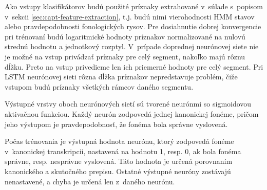 Ako vstupy klasifikátorov budú použité príznaky extrahované v~súlade s~popisom v~sekcii \ref{sec:capt-feature-extraction}, t.j. budú nimi vierohodnosti HMM stavov alebo pravdepodobnosti fonologických rysov. Pre dosiahnutie dobrej konvergencie pri trénovaní budú logaritmické hodnoty príznakov normalizované na nulovú strednú hodnotu a jednotkový rozptyl. V~prípade doprednej neurónovej siete nie je možné na vstup privádzať príznaky pre celý segment, nakoľko majú rôznu dĺžku. Preto na vstup privedieme len ich priemerné hodnoty pre celý segment. Pri LSTM neurónovej sieti rôzna dĺžka príznakov nepredstavuje problém, čiže vstupom budú príznaky všetkých rámcov daného segmentu.

Výstupné vrstvy oboch neurónových sietí sú tvorené neurónmi so sigmoidovou aktivačnou funkciou. Každý neurón zodpovedá jednej kanonickej fonéme, pričom jeho výstupom je pravdepodobnosť, že fonéma bola správne vyslovená.

\noindent Počas trénovania je výstupná hodnota neurónu, ktorý zodpovedá fonéme v~kanonickej transkripcii, nastavená na hodnotu 1, resp. 0, ak bola fonéma správne, resp. nesprávne vyslovená. Táto hodnota je určená porovnaním kanonického a skutočného prepisu. Ostatné výstupné neuróny zostávajú nenastavené, a chyba je určená len z~daného neurónu. 